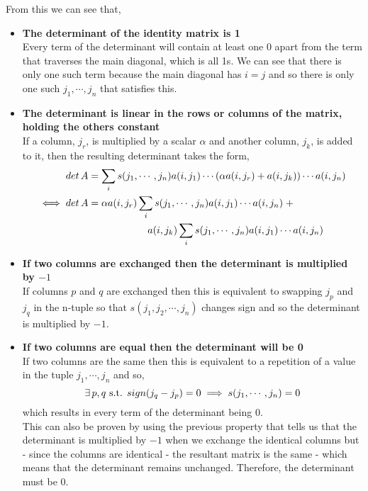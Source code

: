 \documentclass[../MathsNotesBase.tex]{subfiles}
\begin{document}
{		From this we can see that,
		\begin{itemize}
			\item{\textbf{The determinant of the identity matrix is 1}}\\
				Every term of the determinant will contain at least one 0 apart from the term that traverses the main diagonal, which is all 1s. We can see that there is only one such term because the main diagonal has $i = j$ and so there is only one such $j_1, \cdots , j_n$ that satisfies this.
			\item{\textbf{The determinant is linear in the rows or columns of the matrix, holding the others constant}}\\
				If a column, $j_r$, is multiplied by a scalar $\alpha$ and another column, $j_k$, is added to it, then the resulting determinant takes the form,
				\begin{align*}
					det\, A &= \sum_{i}s(j_1,\cdots,j_n)a(i,j_1) \cdots (\alpha{a(i,j_r)} + a(i,j_k)) \cdots a(i,j_n)\\
					\iff det\, A &= \alpha{a(i,j_r)}\sum_{i}s(j_1,\cdots,j_n)a(i,j_1) \cdots  a(i,j_n)\; + \\ 
					&\hspace*{60pt} a(i,j_k)\sum_{i}s(j_1,\cdots,j_n)a(i,j_1) \cdots  a(i,j_n)
				\end{align*}
			\item{\textbf{If two columns are exchanged then the determinant is multiplied by $-1$}}\\
				If columns $p$ and $q$ are exchanged then this is equivalent to swapping $j_p$ and $j_q$ in the n-tuple so that $s(j_1,j_2,\cdots,j_n)$ changes sign and so the determinant is multiplied by $-1$.
			\item{\textbf{If two columns are equal then the determinant will be 0}}\\ 
				If two columns are the same then this is equivalent to a repetition of a value in the tuple $j_1, \cdots, j_n$ and so,
				\[ \exists\, p,q \text{ s.t. } sign(j_q - j_p)  = 0 \implies s(j_1,\cdots,j_n) = 0 \]
				which results in every term of the determinant being $0$.\\
				This can also be proven by using the previous property that tells us that the determinant is multiplied by $-1$ when we exchange the identical columns but - since the columns are identical - the resultant matrix is the same - which means that the determinant remains unchanged. Therefore, the determinant must be $0$.
		\end{itemize}
	
}
\end{document}
